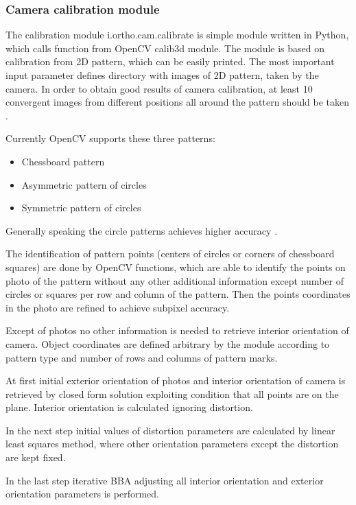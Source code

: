 \documentclass[a4paper,12pt]{article}
\begin{document}
\subsubsection{Camera calibration module}

The calibration module i.ortho.cam.calibrate is simple module written in Python, which calls
function from OpenCV calib3d module. The module is based on cali\-bration from 2D pattern, which can 
be easily printed. The most important input parameter defines directory with images of 2D pattern, 
taken by the camera. In order to obtain good results of camera calibration, at least 10 convergent images 
from different positions all around the pattern should be taken \cite{camera_calibration2013opencv}.

Currently OpenCV supports these three patterns:
\begin{itemize}
\item Chessboard pattern 
\item Asymmetric pattern of circles
\item Symmetric pattern of circles
\end{itemize}

Generally speaking the circle patterns achieves higher accuracy \cite{camera_calibration2013opencv}.

The identification of pattern points (centers of circles or corners of chessboard squares) 
are done by OpenCV functions, which are able to identify the points on photo of the pattern 
without any other additional information except number of circles or squares per row and column
of the pattern. Then the points coordinates in the photo are refined to achieve subpixel accuracy.

Except of photos no other information is needed to retrieve interior orientation of camera.
Object coordinates are defined
arbitrary by the module according to pattern type and number of rows and columns of pattern marks.

At first  initial exterior orientation of photos and interior orientation of camera is retrieved 
by closed form solution exploiting condition that all points are on the plane.
Interior orientation is calculated ignoring distortion.

In the next step initial values of distortion parameters are calculated by linear least squares method, 
where other orientation parameters except the distortion are kept fixed.

In the last step iterative BBA adjusting all interior orientation and exterior orientation parameters 
is performed.
\end{document}
